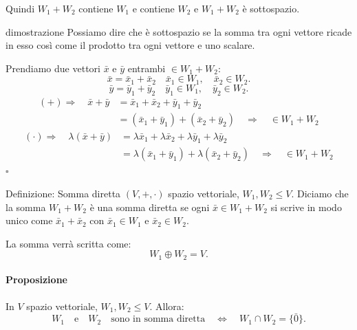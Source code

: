 \documentclass[x11names]{article}
\newcommand*{\QEDB}{\null\nobreak\hfill\ensuremath{\square}}%
\begin{document}
Quindi $W_1 + W_2$ contiene $W_1$ e contiene $W_2$ e $W_1 + W_2$ è sottospazio.
\begin{es}{dimostrazione}
Possiamo dire che è sottospazio se la somma tra ogni vettore ricade in esso così come il prodotto tra ogni vettore e uno scalare.

Prendiamo due vettori $\bar{x}$ e $\bar{y}$ entrambi $\in W_1 + W_2$:
\[
\bar{x} = \bar{x}_{1} + \bar{x}_{2} \quad \bar{x}_1 \in W_1, \quad \bar{x}_{2} \in W_2
.\] 
\[
\bar{y} = \bar{y}_{1} + \bar{y}_{2} \quad \bar{y}_1 \in W_1, \quad \bar{y}_{2} \in W_2
.\] 
\begin{align*}
	\left(+\right)\Rightarrow \quad \bar{x} + \bar{y} &= \bar{x}_{1} + \bar{x}_{2} + \bar{y}_{1} + \bar{y}_{2} \\
						      &= \left(\bar{x}_{1} + \bar{y}_{1}\right) + \left(\bar{x}_{2}+\bar{y}_{2}\right) \quad \Rightarrow \quad \in W_1 + W_2 
\end{align*}
\begin{align*}
	\left(\cdot\right) \Rightarrow \quad \lambda\left(\bar{x}+\bar{y}\right) &= \lambda \bar{x}_{1} + \lambda \bar{x}_{2} + \lambda \bar{y}_{1} + \lambda \bar{y}_{2} \\
						      &= \lambda\left(\bar{x}_{1} + \bar{y}_{1}\right) + \lambda\left(\bar{x}_{2}+\bar{y}_{2}\right) \quad \Rightarrow \quad \in W_1 + W_2
\end{align*}  \QEDB
\end{es}


\begin{center}
\colorbox{myblue}{\begin{minipage}{5.75in}
\begin{blues}{Definizione: Somma diretta}
$\left(V,+,\cdot\right)$ spazio vettoriale, $W_1,W_2 \leq V$. Diciamo che la somma $W_1+W_2$ è una somma diretta se ogni $\bar{x} \in W_1+W_2$ si scrive in modo unico come $\bar{x}_1 + \bar{x}_2$ con $\bar{x}_1 \in W_1$ e $\bar{x}_2 \in W_2 $.

La somma verrà scritta come:
\[
W_1 \oplus W_2 = V
.\] 
\end{blues}
\end{minipage}}        
\end{center}

\paragraph{Proposizione}
In $V$ spazio vettoriale, $W_1,W_2 \leq V$. Allora:
\[
W_1 \quad \text{e} \quad W_2 \quad \text{sono in somma diretta} \quad \Longleftrightarrow \quad W_1 \cap W_2 = \{\bar{0}\} 
.\] 
\end{document}
